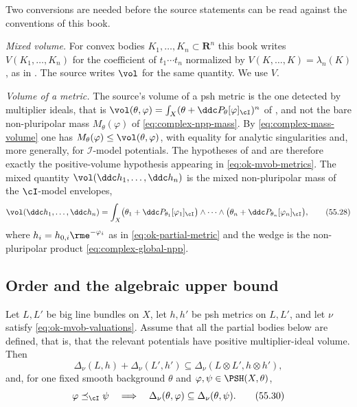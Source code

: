\begin{remark}
\label{rem:ok-mvob-normalizations}
Two conversions are needed before the source statements can be read against
the conventions of this book.

\emph{Mixed volume.}  For convex bodies \(K_1,\dots,K_n\subset\mathbf R^n\)
this book writes \(V(K_1,\dots,K_n)\) for the coefficient of
\(t_1\cdots t_n\) normalized by \(V(K,\dots,K)=\lambda_n(K)\), as in
.  The source writes \(\vol\) for the
same quantity.  We use \(V\).

\emph{Volume of a metric.}  The source's volume of a psh metric is the one
detected by multiplier ideals, that is
\(\vol(\theta,\varphi)=\int_X(\theta+\ddc P_\theta[\varphi]_{\cI})^n\) of
, and not the bare non-pluripolar mass
\(M_\theta(\varphi)\) of \eqref{eq:complex-npp-mass}.  By
\eqref{eq:complex-mass-volume} one has
\(M_\theta(\varphi)\leq\vol(\theta,\varphi)\), with equality for analytic
singularities and, more generally, for \(\mathcal I\)-model potentials.
The hypotheses of  and
 are therefore exactly the
positive-volume hypothesis appearing in \eqref{eq:ok-mvob-metrics}.  The
mixed quantity \(\vol(\ddc h_1,\dots,\ddc h_n)\) is the mixed
non-pluripolar mass of the \(\cI\)-model envelopes,
\[
 \vol(\ddc h_1,\dots,\ddc h_n)
 =\int_X\bigl(\theta_1+\ddc P_{\theta_1}[\varphi_1]_{\cI}\bigr)
        \wedge\cdots\wedge
        \bigl(\theta_n+\ddc P_{\theta_n}[\varphi_n]_{\cI}\bigr),
\tag{55.28}\label{eq:ok-mvob-mixed-mass}
\]
where \(h_i=h_{0,i}\rme^{-\varphi_i}\) as in
\eqref{eq:ok-partial-metric} and the wedge is the non-pluripolar product
\eqref{eq:complex-global-npp}.
\end{remark}

\subsection{Order and the algebraic upper bound}

\begin{proposition}
\label{prop:ok-mvob-superadditivity}
Let \(L,L'\) be big line bundles on \(X\), let \(h,h'\) be psh metrics on
\(L,L'\), and let \(\nu\) satisfy \eqref{eq:ok-mvob-valuations}.  Assume
that all the partial bodies below are defined, that is, that the relevant
potentials have positive multiplier-ideal volume.  Then
\[
 \Delta_\nu(L,h)+\Delta_\nu(L',h')
   \subseteq\Delta_\nu(L\otimes L',h\otimes h'),
\tag{55.29}\label{eq:ok-mvob-superadditivity}
\]
and, for one fixed smooth background \(\theta\) and
\(\varphi,\psi\in\PSH(X,\theta)\),
\[
 \varphi\preceq_{\cI}\psi
   \quad\Longrightarrow\quad
 \Delta_\nu(\theta,\varphi)\subseteq\Delta_\nu(\theta,\psi).
\tag{55.30}\label{eq:ok-mvob-i-monotone}
\]
\end{proposition}

